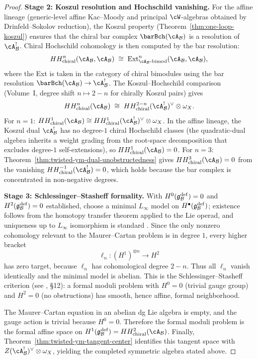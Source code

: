 \begin{proof}
\medskip\noindent\textbf{Stage 2: Koszul resolution and Hochschild vanishing.}
For the affine lineage (generic-level affine Kac--Moody and principal $\cW$-algebras obtained by Drinfeld--Sokolov reduction), the Koszul property (Theorem~\ref{thm:one-loop-koszul}) ensures that the chiral bar complex $\barBch(\cA_{\cB})$ is a resolution of $\cA_{\cB}^!$. Chiral Hochschild cohomology is then computed by the bar resolution:
\[
HH^n_{\mathrm{chiral}}(\cA_{\cB},\cA_{\cB})
\;\cong\;
\mathrm{Ext}^n_{\cA_{\cB}\text{-}\mathrm{bimod}}(\cA_{\cB},\cA_{\cB}),
\]
where the Ext is taken in the category of chiral bimodules using the bar resolution $\barBch(\cA_{\cB}) \to \cA_{\cB}^!$. The Koszul--Hochschild comparison (Volume~I, degree shift $n \mapsto 2-n$ for chirally Koszul pairs) gives
\[
HH^n_{\mathrm{chiral}}(\cA_{\cB})
\;\cong\;
HH^{2-n}_{\mathrm{chiral}}(\cA_{\cB}^!)^{\vee} \otimes \omega_X.
\]
For $n=1$: $HH^1_{\mathrm{chiral}}(\cA_{\cB}) \cong HH^{1}_{\mathrm{chiral}}(\cA_{\cB}^!)^{\vee} \otimes \omega_X$. In the affine lineage, the Koszul dual $\cA_{\cB}^!$ has no degree-$1$ chiral Hochschild classes (the quadratic-dual algebra inherits a weight grading from the root-space decomposition that excludes degree-$1$ self-extensions), so $HH^1_{\mathrm{chiral}}(\cA_{\cB}) = 0$. For $n=3$: Theorem~\ref{thm:twisted-ym-dual-unobstructedness} gives $HH^3_{\mathrm{chiral}}(\cA_{\cB}) = 0$ from the vanishing $HH^{-1}_{\mathrm{chiral}}(\cA_{\cB}^!) = 0$, which holds because the bar complex is concentrated in non-negative degrees.

\medskip\noindent\textbf{Stage 3: Schlessinger--Stasheff formality.}
With $H^0(\mathfrak{g}^{\mathrm{def}}_{\mathcal{B}}) = 0$ and $H^2(\mathfrak{g}^{\mathrm{def}}_{\mathcal{B}}) = 0$ established, choose a minimal $L_\infty$ model on $H^\bullet(\mathfrak{g}^{\mathrm{def}}_{\mathcal{B}})$; existence follows from the homotopy transfer theorem applied to the Lie operad, and uniqueness up to $L_\infty$ isomorphism is standard \cite{LV12}. Since the only nonzero cohomology relevant to the Maurer--Cartan problem is in degree $1$, every higher bracket
\[
\ell_n \colon (H^1)^{\otimes n} \longrightarrow H^{2}
\]
has zero target, because $\ell_n$ has cohomological degree $2-n$. Thus all $\ell_n$ vanish identically and the minimal model is abelian. This is the Schlessinger--Stasheff criterion (see \cite{LV12}, \S12): a formal moduli problem with $H^0 = 0$ (trivial gauge group) and $H^2 = 0$ (no obstructions) has smooth, hence affine, formal neighborhood.

The Maurer--Cartan equation in an abelian dg Lie algebra is empty, and the gauge action is trivial because $H^0=0$. Therefore the formal moduli problem is the formal affine space on $H^1(\mathfrak{g}^{\mathrm{def}}_{\cB}) = HH^2_{\mathrm{chiral}}(\cA_{\cB})$. Finally, Theorem~\ref{thm:twisted-ym-tangent-center} identifies this tangent space with $Z(\cA_{\cB}^{!})^{\vee}\otimes\omega_X$, yielding the completed symmetric algebra stated above.
\end{proof}

